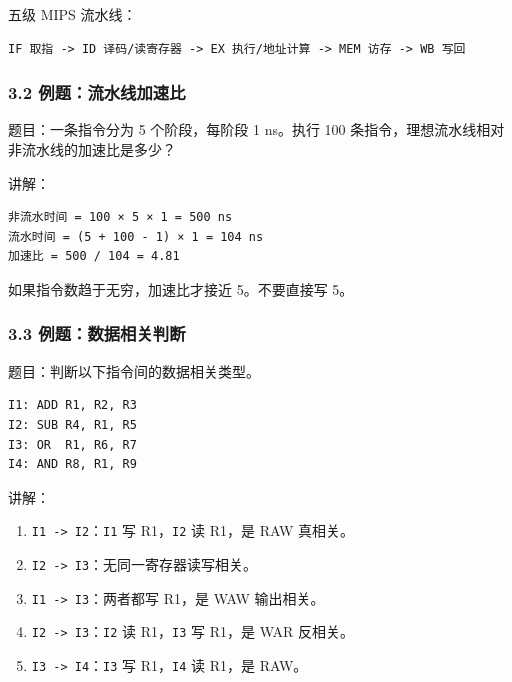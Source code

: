 \documentclass[
]{ctexart}
\newcommand{\passthrough}[1]{#1}
\providecommand{\tightlist}{%
  \setlength{\itemsep}{0pt}\setlength{\parskip}{0pt}}
\begin{document}
五级 MIPS 流水线：

\begin{lstlisting}
IF 取指 -> ID 译码/读寄存器 -> EX 执行/地址计算 -> MEM 访存 -> WB 写回
\end{lstlisting}

\subsubsection{3.2
例题：流水线加速比}\label{ux4f8bux9898ux6d41ux6c34ux7ebfux52a0ux901fux6bd4}

题目：一条指令分为 5 个阶段，每阶段 1 ns。执行 100
条指令，理想流水线相对非流水线的加速比是多少？

讲解：

\begin{lstlisting}
非流水时间 = 100 × 5 × 1 = 500 ns
流水时间 = (5 + 100 - 1) × 1 = 104 ns
加速比 = 500 / 104 = 4.81
\end{lstlisting}

如果指令数趋于无穷，加速比才接近 5。不要直接写 5。

\subsubsection{3.3
例题：数据相关判断}\label{ux4f8bux9898ux6570ux636eux76f8ux5173ux5224ux65ad}

题目：判断以下指令间的数据相关类型。

\begin{lstlisting}
I1: ADD R1, R2, R3
I2: SUB R4, R1, R5
I3: OR  R1, R6, R7
I4: AND R8, R1, R9
\end{lstlisting}

讲解：

\begin{enumerate}
\def\labelenumi{\arabic{enumi}.}
\tightlist
\item
  \passthrough{\lstinline!I1 -> I2!}：\passthrough{\lstinline!I1!} 写
  R1，\passthrough{\lstinline!I2!} 读 R1，是 RAW 真相关。
\item
  \passthrough{\lstinline!I2 -> I3!}：无同一寄存器读写相关。
\item
  \passthrough{\lstinline!I1 -> I3!}：两者都写 R1，是 WAW 输出相关。
\item
  \passthrough{\lstinline!I2 -> I3!}：\passthrough{\lstinline!I2!} 读
  R1，\passthrough{\lstinline!I3!} 写 R1，是 WAR 反相关。
\item
  \passthrough{\lstinline!I3 -> I4!}：\passthrough{\lstinline!I3!} 写
  R1，\passthrough{\lstinline!I4!} 读 R1，是 RAW。
\end{enumerate}
\end{document}

